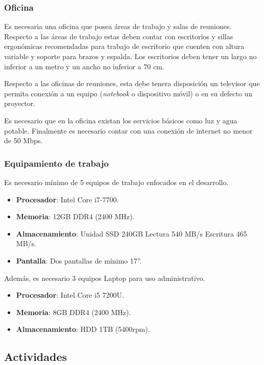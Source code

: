 \subsubsection{Oficina}

Es necesaria una oficina que posea áreas de trabajo y salas de reuniones. Respecto a las áreas de trabajo estas deben contar con escritorios y sillas ergonómicas recomendadas para trabajo de escritorio que cuenten con altura variable y soporte para brazos y espalda. Los escritorios deben tener un largo no inferior a un metro y un ancho no inferior a 70 cm. 

Respecto a las oficinas de reuniones, esta debe tenera disposición un televisor que permita conexión a un equipo (\textit{notebook} o dispositivo móvil) o en su defecto un proyector.

Es necesario que en la oficina existan los servicios básicos como luz y agua potable. Finalmente es necesario contar con una conexión de internet no menor de 50 Mbps.

\subsubsection{Equipamiento de trabajo}

Es necesario mínimo de 5 equipos de trabajo enfocados en el desarrollo.

	\begin{itemize}
		\item 
		\textbf{Procesador}: Intel Core i7-7700.
		\item 
		\textbf{Memoria}: 12GB DDR4 (2400 MHz).
		\item 
		\textbf{Almacenamiento}: Unidad SSD 240GB Lectura 540 MB/s Escritura 465 MB/s.
		\item 
		\textbf{Pantalla}: Dos pantallas de mínimo 17”.
	\end{itemize}

Además, es necesario  3 equipos Laptop para uso administrativo. 

	\begin{itemize}
		\item 
		\textbf{Procesador}: Intel Core i5 7200U.
		\item 
		\textbf{Memoria}: 8GB DDR4 (2400 MHz).
		\item 
		\textbf{Almacenamiento}: HDD 1TB (5400rpm).
	\end{itemize}

\subsection{Actividades}

